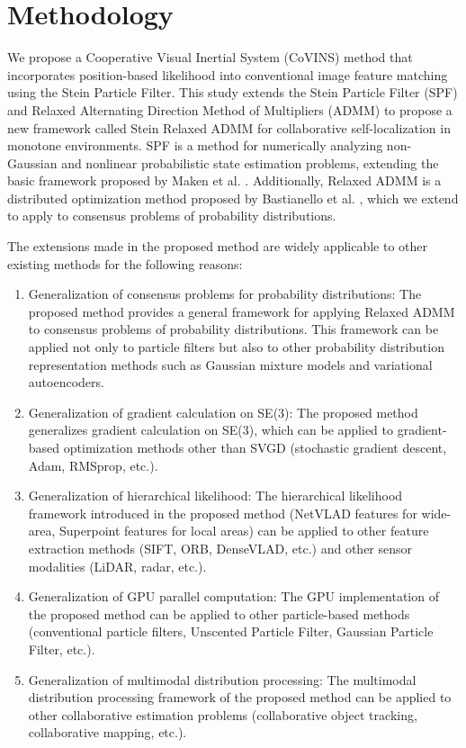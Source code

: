 \documentclass[a4paper,fleqn,10pt,twocolumn]{SICE_ISCS}
\begin{document}
\section{Methodology}
We propose a Cooperative Visual Inertial System (CoVINS) method that incorporates position-based likelihood into conventional image feature matching using the Stein Particle Filter. This study extends the Stein Particle Filter (SPF) and Relaxed Alternating Direction Method of Multipliers (ADMM) to propose a new framework called Stein Relaxed ADMM for collaborative self-localization in monotone environments. SPF is a method for numerically analyzing non-Gaussian and nonlinear probabilistic state estimation problems, extending the basic framework proposed by Maken et al. \cite{Maken2021}. Additionally, Relaxed ADMM is a distributed optimization method proposed by Bastianello et al. \cite{Bastianello2020}, which we extend to apply to consensus problems of probability distributions.

The extensions made in the proposed method are widely applicable to other existing methods for the following reasons:

\begin{enumerate}
\item Generalization of consensus problems for probability distributions: The proposed method provides a general framework for applying Relaxed ADMM to consensus problems of probability distributions. This framework can be applied not only to particle filters but also to other probability distribution representation methods such as Gaussian mixture models and variational autoencoders.

\item Generalization of gradient calculation on SE(3): The proposed method generalizes gradient calculation on SE(3), which can be applied to gradient-based optimization methods other than SVGD (stochastic gradient descent, Adam, RMSprop, etc.).

\item Generalization of hierarchical likelihood: The hierarchical likelihood framework introduced in the proposed method (NetVLAD features for wide-area, Superpoint features for local areas) can be applied to other feature extraction methods (SIFT, ORB, DenseVLAD, etc.) and other sensor modalities (LiDAR, radar, etc.).

\item Generalization of GPU parallel computation: The GPU implementation of the proposed method can be applied to other particle-based methods (conventional particle filters, Unscented Particle Filter, Gaussian Particle Filter, etc.).

\item Generalization of multimodal distribution processing: The multimodal distribution processing framework of the proposed method can be applied to other collaborative estimation problems (collaborative object tracking, collaborative mapping, etc.).
\end{enumerate}
\end{document}
